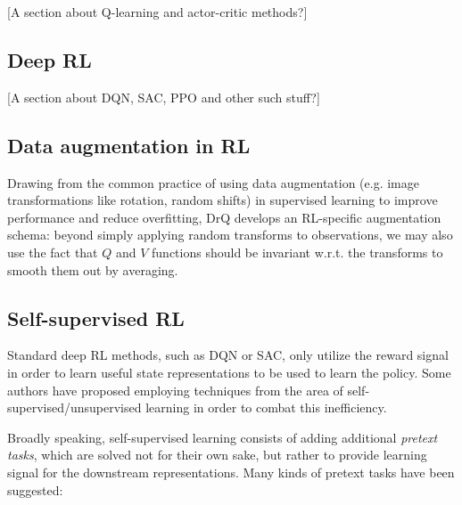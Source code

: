 \documentclass[twoside,11pt]{article}
\begin{document}
    [A section about Q-learning and actor-critic methods?]

\subsection{Deep RL}

[A section about DQN, SAC, PPO and other such stuff?]

\subsection{Data augmentation in RL}

Drawing from the common practice of using data augmentation (e.g. image transformations like rotation, random shifts) in supervised learning to improve performance and reduce overfitting, DrQ develops an RL-specific augmentation schema: beyond simply applying random transforms to observations, we may also use the fact that $Q$ and $V$ functions should be invariant w.r.t. the transforms to smooth them out by averaging.

\subsection{Self-supervised RL}

Standard deep RL methods, such as DQN or SAC, only utilize the reward signal in order to learn useful state representations to be used to learn the policy. Some authors have proposed employing techniques from the area of self-supervised/unsupervised learning in order to combat this inefficiency.

Broadly speaking, self-supervised learning consists of adding additional \emph{pretext tasks}, which are solved not for their own sake, but rather to provide learning signal for the downstream representations. Many kinds of pretext tasks have been suggested:
\end{document}
